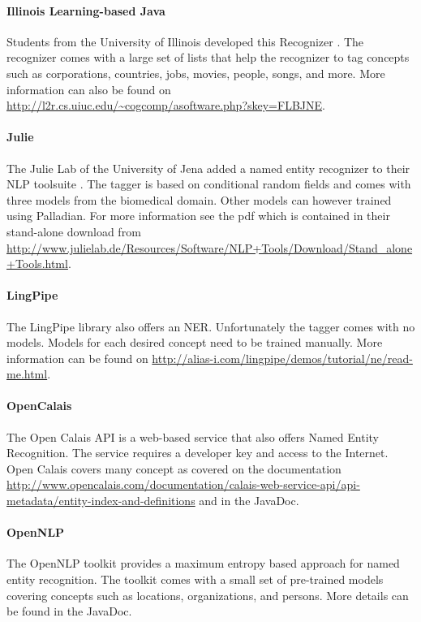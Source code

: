 \paragraph{Illinois Learning-based Java} Students from the University of Illinois developed this Recognizer \cite{illinoisccg}. The recognizer comes with a large set of lists that help the recognizer to tag concepts such as corporations, countries, jobs, movies, people, songs, and more. More information can also be found on \url{http://l2r.cs.uiuc.edu/~cogcomp/asoftware.php?skey=FLBJNE}.

\paragraph{Julie} The Julie Lab of the University of Jena added a named entity recognizer to their NLP toolsuite \cite{hahn2008overview}. The tagger is based on conditional random fields and comes with three models from the biomedical domain. Other models can however trained using Palladian. For more information see the pdf which is contained in their stand-alone download from \url{http://www.julielab.de/Resources/Software/NLP+Tools/Download/Stand_alone+Tools.html}.

\paragraph{LingPipe} The LingPipe library \cite{lingpipe} also offers an NER. Unfortunately the tagger comes with no models. Models for each desired concept need to be trained manually. More information can be found on \url{http://alias-i.com/lingpipe/demos/tutorial/ne/read-me.html}.

\paragraph{OpenCalais} The Open Calais API \cite{opencalais} is a web-based service that also offers Named Entity Recognition. The service requires a developer key and access to the Internet. Open Calais covers many concept as covered on the documentation \url{http://www.opencalais.com/documentation/calais-web-service-api/api-metadata/entity-index-and-definitions} and in the JavaDoc.

\paragraph{OpenNLP} The OpenNLP toolkit \cite{opennlp} provides a maximum entropy based approach for named entity recognition. The toolkit comes with a small set of pre-trained models covering concepts such as locations, organizations, and persons. More details can be found in the JavaDoc.


